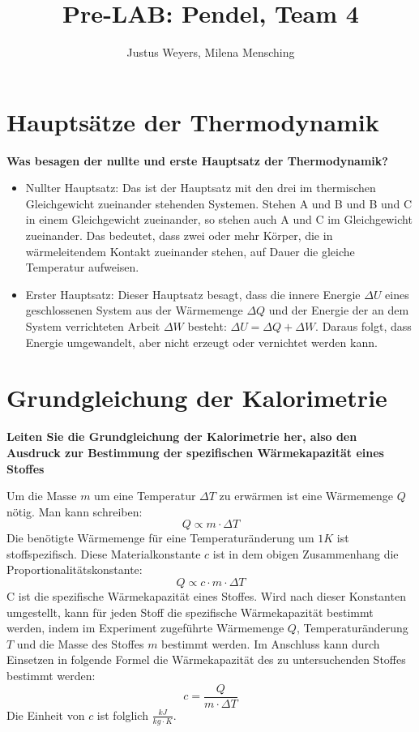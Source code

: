 \documentclass[a4paper, 12pt]{article}
\title{Pre-LAB: Pendel, Team 4}
\author{Justus Weyers, Milena Mensching}
\begin{document}
\maketitle
\section{Hauptsätze der Thermodynamik}
\textbf{Was besagen der nullte und erste Hauptsatz der Thermodynamik?}

\begin{itemize}
\item Nullter Hauptsatz: Das ist der Hauptsatz mit den drei im thermischen Gleichgewicht zueinander stehenden Systemen. Stehen A und B und B und C in einem Gleichgewicht zueinander, so stehen auch A und C im Gleichgewicht zueinander. Das bedeutet, dass zwei oder mehr Körper, die in wärmeleitendem Kontakt zueinander stehen, auf Dauer die gleiche Temperatur aufweisen.  
\item Erster Hauptsatz: Dieser Hauptsatz besagt, dass die innere Energie $\Delta U$ eines geschlossenen System aus der Wärmemenge $\Delta Q$ und der Energie der an dem System verrichteten Arbeit $\Delta W$ besteht: $\Delta U=\Delta Q + \Delta W$. Daraus folgt, dass Energie umgewandelt, aber nicht erzeugt oder vernichtet werden kann. 
\end{itemize}

\section{Grundgleichung der Kalorimetrie}
\textbf{Leiten Sie die Grundgleichung der Kalorimetrie her, also den Ausdruck zur Bestimmung
der spezifischen Wärmekapazität eines Stoffes}

Um die Masse $m$ um eine Temperatur $\Delta T$ zu erwärmen ist eine Wärmemenge $Q$ nötig. Man kann schreiben:
$$Q \propto m \cdot \Delta T$$
Die benötigte Wärmemenge für eine Temperaturänderung um $1K$ ist stoffspezifisch. Diese Materialkonstante $c$ ist in dem obigen Zusammenhang die Proportionalitätskonstante:
$$Q \propto c \cdot m \cdot \Delta T$$
C ist die spezifische Wärmekapazität eines Stoffes.
Wird nach dieser Konstanten umgestellt, kann für jeden Stoff die spezifische Wärmekapazität bestimmt werden, indem im Experiment zugeführte Wärmemenge $Q$, Temperaturänderung $T$ und die Masse des Stoffes $m$ bestimmt werden. Im Anschluss kann durch Einsetzen in folgende Formel die Wärmekapazität des zu untersuchenden Stoffes bestimmt werden:
$$c=\frac{Q}{m \cdot \Delta T}$$ 
Die Einheit von $c$ ist folglich $\frac{kJ}{kg \cdot K}$.
\end{document}
